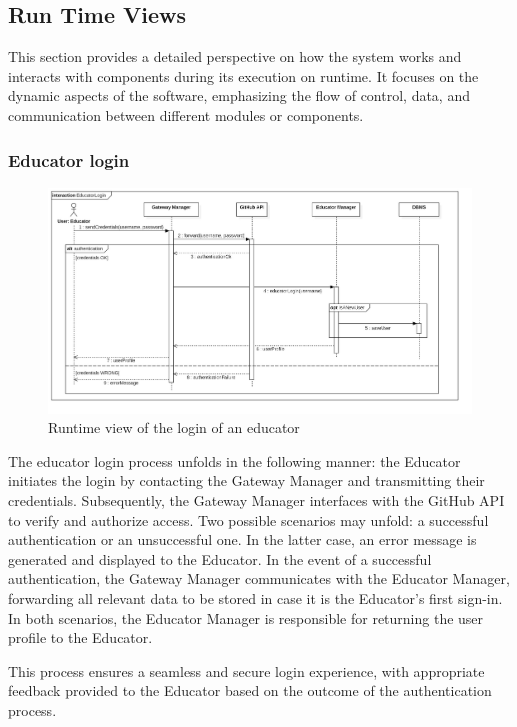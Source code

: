 \subsection{Run Time Views}

This section provides a detailed perspective on how the system works and interacts with components during its execution on runtime. It focuses on the dynamic aspects of the software, emphasizing the flow of control, data, and communication between different modules or components.


\subsubsection*{Educator login}
\begin{figure}[h!]
    \centering
    \includegraphics[width=1\linewidth]{2.ArchitecturalDesign/res/EducatorLogin.jpg}
    \caption{Runtime view of the login of an educator}
    \label{fig:educator_login}
\end{figure}

The educator login process unfolds in the following manner: the Educator initiates the login by contacting the Gateway Manager and transmitting their credentials. Subsequently, the Gateway Manager interfaces with the GitHub API to verify and authorize access. Two possible scenarios may unfold: a successful authentication or an unsuccessful one. In the latter case, an error message is generated and displayed to the Educator. In the event of a successful authentication, the Gateway Manager communicates with the Educator Manager, forwarding all relevant data to be stored in case it is the Educator's first sign-in. In both scenarios, the Educator Manager is responsible for returning the user profile to the Educator.

This process ensures a seamless and secure login experience, with appropriate feedback provided to the Educator based on the outcome of the authentication process.
\newpage

